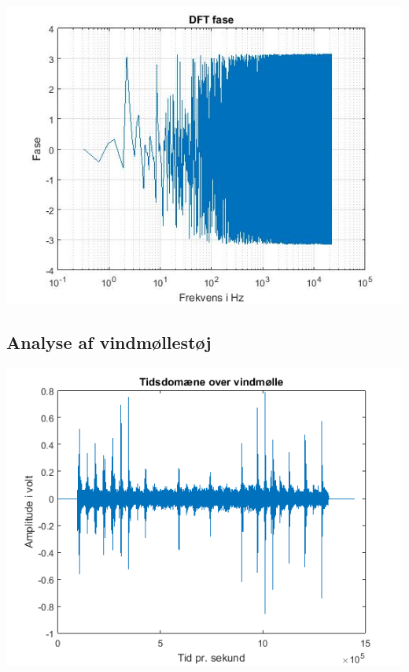 \documentclass[12pt, letterpaper]{article}
\begin{document}
\begin{center}
\includegraphics[width=\textwidth]{billeder/fasebilmotor}
\end{center}

\subsection{Analyse af vindmøllestøj}

\begin{center}
\includegraphics[width=\textwidth]{billeder/vindtid}
\end{center}
\end{document}
